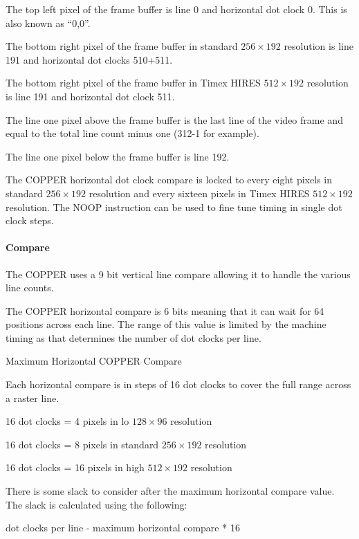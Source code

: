 The top left pixel of the frame buffer is line 0 and horizontal dot
clock 0. This is also known as ``0,0''.

The bottom right pixel of the frame buffer in standard $256\times192$
resolution is line 191 and horizontal dot clocks 510+511.

The bottom right pixel of the frame buffer in Timex HIRES
$512\times192$ resolution is line 191 and horizontal dot clock 511.

The line one pixel above the frame buffer is the last line of the
video frame and equal to the total line count minus one (312-1 for
example).

The line one pixel below the frame buffer is line 192.

The COPPER horizontal dot clock compare is locked to every eight
pixels in standard $256\times192$ resolution and every sixteen pixels
in Timex HIRES $512\times192$ resolution. The NOOP instruction can be
used to fine tune timing in single dot clock steps.

\paragraph{Compare}

The COPPER uses a 9 bit vertical line compare allowing it to handle
the various line counts.

The COPPER horizontal compare is 6 bits meaning that it can wait for
64 positions across each line. The range of this value is limited by
the machine timing as that determines the number of dot clocks per
line.

\begin{table}[h]\centering
  \caption{Maximum Horizontal COPPER Compare}
\end{table}

Each horizontal compare is in steps of 16 dot clocks to cover the full
range across a raster line.

16 dot clocks = 4 pixels in lo $128\times96$ resolution

16 dot clocks = 8 pixels in standard $256\times192$ resolution

16 dot clocks = 16 pixels in high $512\times192$ resolution

There is some slack to consider after the maximum horizontal compare
value. The slack is calculated using the following:

dot clocks per line - maximum horizontal compare * 16
          
